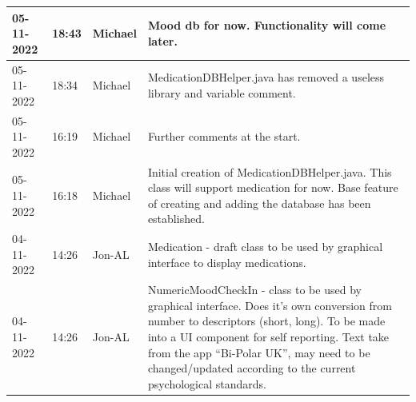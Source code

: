 \documentclass[11pt]{article}
\begin{document}
\begin{center}
\begin{longtable}{|p{2cm}|l|p{2cm}|p{10.5cm}|}
            05-11-2022                                 & 18:43                              & Michael                                 & Mood db for now. Functionality will come later.                                                                                                                                                                                                                                                              \\ \hline
            05-11-2022                                 & 18:34                              & Michael                                 & MedicationDBHelper.java has removed a useless library and variable comment.                                                                                                                                                                                                                                  \\ \hline
            05-11-2022                                 & 16:19                              & Michael                                 & Further comments at the start.                                                                                                                                                                                                                                                                               \\ \hline
            05-11-2022                                 & 16:18                              & Michael                                 & Initial creation of MedicationDBHelper.java. This class will support medication for now. Base feature of creating and adding the database has been established.                                                                                                                                              \\ \hline
            04-11-2022                                 & 14:26                              & Jon-AL                                  & Medication - draft class to be used by graphical interface to display medications.                                                                                                                                                                                                                           \\ \hline
            04-11-2022                                 & 14:26                              & Jon-AL                                  & NumericMoodCheckIn - class to be used by graphical interface. Does it's own conversion from number to descriptors (short, long). To be made into a UI component for self reporting. Text take from the app ``Bi-Polar UK'', may need to be changed/updated according to the current psychological standards. \\ \hline

\end{longtable}
\end{center}
\end{document}
